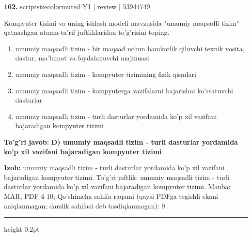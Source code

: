 \documentclass[10pt,a4paper]{article}
\begin{document}
{\bfseries\sffamily\color{ink} 162.} {scriptsizecolor{muted} Y1 | review | 53944749}
\par
Kompyuter tizimi va uning ishlash modeli mavzusida "umumiy maqsadli tizim" qatnashgan atama-ta'rif juftliklaridan to'g'risini toping.
\begin{enumerate}[label=\Alph*),leftmargin=9mm]
\item umumiy maqsadli tizim - bir maqsad uchun hamkorlik qiluvchi texnik vosita, dastur, ma'lumot va foydalanuvchi majmuasi
\item umumiy maqsadli tizim - kompyuter tizimining fizik qismlari
\item umumiy maqsadli tizim - kompyuterga vazifalarni bajarishni ko'rsatuvchi dasturlar
\item umumiy maqsadli tizim - turli dasturlar yordamida ko'p xil vazifani bajaradigan kompyuter tizimi
\end{enumerate}
\begin{tcolorbox}[enhanced,breakable,colback=teal!4,colframe=teal!60!black,boxrule=0.45pt,arc=1.2mm,left=2.7mm,right=2.7mm,top=1.8mm,bottom=1.8mm,before skip=2mm,after skip=2mm]
{\bfseries\sffamily\color{teal}To'g'ri javob:} \textbf{D) umumiy maqsadli tizim - turli dasturlar yordamida ko'p xil vazifani bajaradigan kompyuter tizimi}
\par\smallskip
{\bfseries Izoh:} umumiy maqsadli tizim - turli dasturlar yordamida ko'p xil vazifani bajaradigan kompyuter tizimi. To'g'ri juftlik: umumiy maqsadli tizim - turli dasturlar yordamida ko'p xil vazifani bajaradigan kompyuter tizimi. Manba: MAR, PDF 4-10; Qo'shimcha sahifa raqami (qaysi PDFga tegishli ekani aniqlanmagan; darslik sahifasi deb tasdiqlanmagan): 9
\end{tcolorbox}
\vspace{2mm}\hrule height 0.2pt\vspace{3mm}
\end{document}
